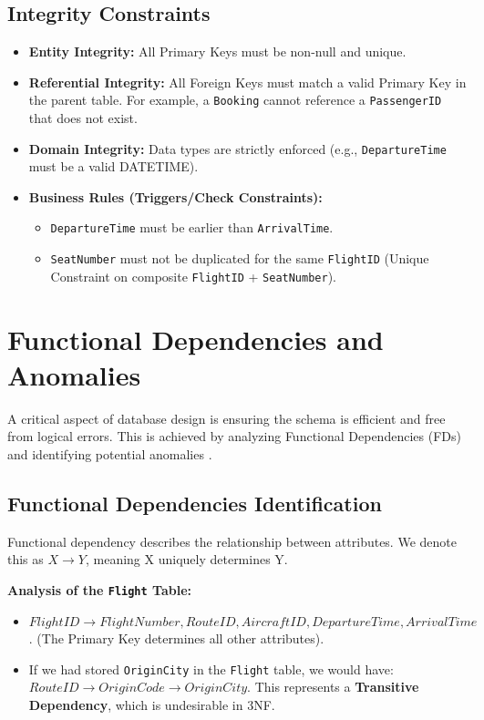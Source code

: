 \documentclass[12pt, a4paper]{article}
\begin{document}
	\subsection{Integrity Constraints}
	\begin{itemize}
		\item \textbf{Entity Integrity:} All Primary Keys must be non-null and unique.
		\item \textbf{Referential Integrity:} All Foreign Keys must match a valid Primary Key in the parent table. For example, a \texttt{Booking} cannot reference a \texttt{PassengerID} that does not exist.
		\item \textbf{Domain Integrity:} Data types are strictly enforced (e.g., \texttt{DepartureTime} must be a valid DATETIME).
		\item \textbf{Business Rules (Triggers/Check Constraints):}
		\begin{itemize}
			\item \texttt{DepartureTime} must be earlier than \texttt{ArrivalTime}.
			\item \texttt{SeatNumber} must not be duplicated for the same \texttt{FlightID} (Unique Constraint on composite \texttt{FlightID} + \texttt{SeatNumber}).
		\end{itemize}
	\end{itemize}
	
	\newpage
	\section{Functional Dependencies and Anomalies}
	
	A critical aspect of database design is ensuring the schema is efficient and free from logical errors. This is achieved by analyzing Functional Dependencies (FDs) and identifying potential anomalies \cite{ref47}.
	
	\subsection{Functional Dependencies Identification}
	
	Functional dependency describes the relationship between attributes. We denote this as $X \rightarrow Y$, meaning X uniquely determines Y.
	
	\textbf{Analysis of the \texttt{Flight} Table:}
	\begin{itemize}
		\item $FlightID \rightarrow FlightNumber, RouteID, AircraftID, DepartureTime, ArrivalTime$. (The Primary Key determines all other attributes).
		\item If we had stored \texttt{OriginCity} in the \texttt{Flight} table, we would have: $RouteID \rightarrow OriginCode \rightarrow OriginCity$. This represents a \textbf{Transitive Dependency}, which is undesirable in 3NF.
	\end{itemize}
	
\end{document}
